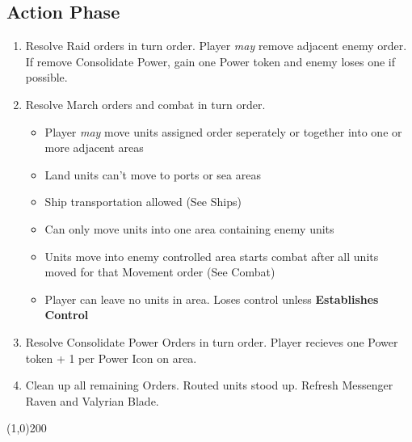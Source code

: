 \documentclass[10pt]{article}
\newenvironment{enumerateCustom}
{\begin{enumerate}
  \setlength{\itemsep}{1pt}
  \setlength{\parskip}{0pt}
  \setlength{\parsep}{0pt}}
{\end{enumerate}}
\newenvironment{itemizeCustom}
{\begin{itemize}
  \setlength{\itemsep}{1pt}
  \setlength{\parskip}{0pt}
  \setlength{\parsep}{0pt}}
{\end{itemize}}
\begin{document}
\begin{multicols*}{2}
\section*{Action Phase}
\begin{enumerateCustom}
	\item Resolve Raid orders in turn order. Player \emph{may} remove adjacent enemy order. If remove Consolidate Power, gain one Power token and enemy loses one if possible.
	\item Resolve March orders and combat in turn order. 
	\begin{itemizeCustom}
		\item Player \emph{may} move units assigned order seperately or together into one or more adjacent areas
		\item Land units can't move to ports or sea areas
		\item Ship transportation allowed (See Ships)
		\item Can only move units into one area containing enemy units
		\item Units move into enemy controlled area starts combat after all units moved for that Movement order (See Combat)
		\item Player can leave no units in area. Loses control unless \textbf{Establishes Control}
	\end{itemizeCustom}
	\item Resolve Consolidate Power Orders in turn order. Player recieves one Power token + 1 per Power Icon on area.
	\item Clean up all remaining Orders. Routed units stood up. Refresh Messenger Raven and Valyrian Blade.
\end{enumerateCustom}

\begin{center}
\line(1,0){200}
\end{center}


\end{multicols*}
\end{document}
